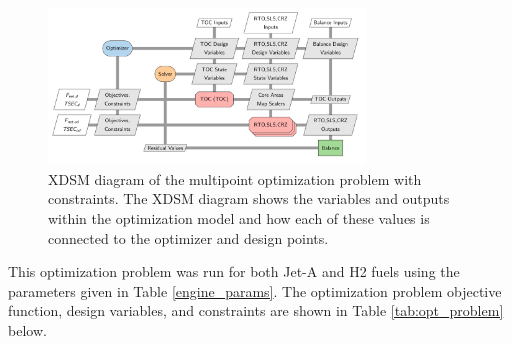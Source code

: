 \documentclass[conf]{new-aiaa}
\begin{document}
\begin{figure}[!hbt]
    \centering
    \includegraphics[width=0.75\textwidth]{N3_xdsm_opt.pdf}
    \caption{
        XDSM diagram of the multipoint optimization problem with constraints.
        The XDSM diagram shows the variables and outputs within the optimization model and how each of these values is connected to the optimizer and design points.}
    \label{fig:N3_xdsm_opt}
\end{figure}

This optimization problem was run for both Jet-A and H2 fuels using the parameters given in Table \ref{engine_params}.
The optimization problem objective function, design variables, and constraints are shown in Table \ref{tab:opt_problem} below.
\end{document}
